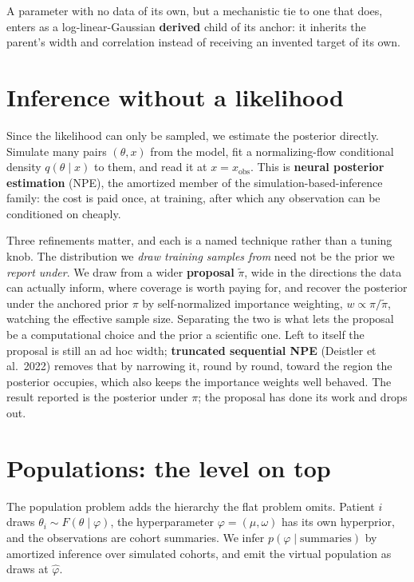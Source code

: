 \documentclass[11pt]{article}
\newcommand{\vocab}[1]{\textcolor{vocabc}{\textbf{#1}}}
\renewcommand{\th}{\theta}
\newcommand{\xobs}{x_{\mathrm{obs}}}
\begin{document}
A parameter with no data of its own, but a mechanistic tie to one that does, enters as a
log-linear-Gaussian \vocab{derived} child of its anchor: it inherits the parent's width
and correlation instead of receiving an invented target of its own.

\section{Inference without a likelihood}

Since the likelihood can only be sampled, we estimate the posterior directly. Simulate
many pairs $(\th, x)$ from the model, fit a normalizing-flow conditional density
$q(\th \mid x)$ to them, and read it at $x = \xobs$. This is \vocab{neural posterior
estimation} (NPE), the amortized member of the simulation-based-inference family: the
cost is paid once, at training, after which any observation can be conditioned on
cheaply.

Three refinements matter, and each is a named technique rather than a tuning knob. The
distribution we \emph{draw training samples from} need not be the prior we \emph{report
under}. We draw from a wider \vocab{proposal} $\tilde\pi$, wide in the directions the data
can actually inform, where coverage is worth paying for, and recover the posterior under
the anchored prior $\pi$ by self-normalized importance weighting, $w \propto
\pi/\tilde\pi$, watching the effective sample size. Separating the two is what lets the
proposal be a computational choice and the prior a scientific one. Left to itself the
proposal is still an ad hoc width; \vocab{truncated sequential NPE} (Deistler et al.\
2022) removes that by narrowing it, round by round, toward the region the posterior
occupies, which also keeps the importance weights well behaved. The result reported is
the posterior under $\pi$; the proposal has done its work and drops out.

\section{Populations: the level on top}

The population problem adds the hierarchy the flat problem omits. Patient $i$ draws
$\th_i \sim F(\th \mid \varphi)$, the hyperparameter $\varphi = (\mu, \omega)$ has its own
hyperprior, and the observations are cohort summaries. We infer
$p(\varphi \mid \text{summaries})$ by amortized inference over simulated cohorts, and emit
the virtual population as draws at $\hat\varphi$.
\end{document}
